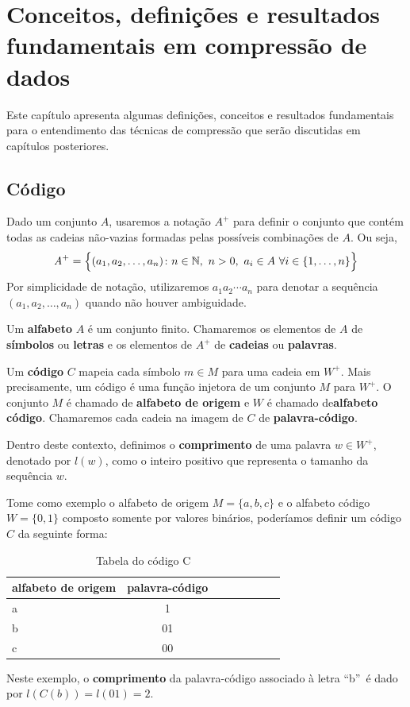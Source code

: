 \chapter{Conceitos, definições e resultados fundamentais em compressão de dados}
Este capítulo apresenta algumas definições, conceitos e resultados fundamentais para o entendimento das técnicas de compressão que serão discutidas em capítulos posteriores.

\section{Código}

Dado um conjunto $A$, usaremos a notação $A^+$ para definir o conjunto
que contém todas as cadeias não-vazias formadas pelas possíveis
combinações de $A$. Ou seja,
\begin{equation*}
  \emph{A}^+ = \Big\{
  (a_1,a_2,\dotsc, a_n) \colon n\in\mathbb{N}, \ n>0,
  \ a_i \in A \ \forall i \in \{1,\dotsc,n\} 
  \Big\}
\end{equation*}
Por simplicidade de notação, utilizaremos $a_1a_2\dotsm a_n$ para
denotar a sequência $(a_1,a_2,\dotsc, a_n)$ quando não houver
ambiguidade.

Um \textbf{alfabeto} $A$ é um conjunto finito. Chamaremos os elementos
de $A$ de \textbf{símbolos} ou \textbf{letras} e os elementos de $A^+$
de \textbf{cadeias} ou \textbf{palavras}.

Um \textbf{código} $C$ mapeia cada símbolo $m \in M$ para uma cadeia
em $W^+$. Mais precisamente, um código é uma função injetora de um
conjunto $M$ para $W^+$. O conjunto $M$ é chamado de \textbf{alfabeto
  de origem} e $W$ é chamado de\textbf{alfabeto código}. Chamaremos
cada cadeia na imagem de $C$ de \textbf{palavra-código}.

Dentro deste contexto, definimos o \textbf{comprimento} de uma palavra
$w\in W^+$, denotado por $l(w)$, como o inteiro positivo que
representa o tamanho da sequência $w$.

Tome como exemplo o alfabeto de origem $M = \{a, b, c\}$ e o alfabeto
código $W = \{0, 1\}$ composto somente por valores binários,
poderíamos definir um código $C$ da seguinte forma:

\begin{table}[!h]
   \centering
   \caption{Tabela do código C} \label{tab:vcode}
   \begin{tabular}{|l|c|c|c|c|c|c|r|}
        \hline
        \small{alfabeto de origem} & \small{palavra-código} \\ \hline
              a &   1   \\ \hline
              b &   01  \\ \hline
              c &   00  \\ \hline
  \end{tabular}
\end{table}
Neste exemplo, o \textbf{comprimento} da palavra-código associado à
letra ``b''~é dado por $l(C(b)) = l(01) = 2$.

